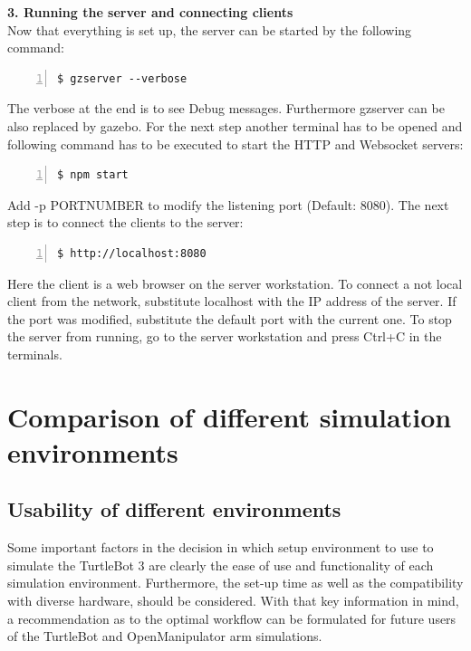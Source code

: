 \documentclass[plainarticle,zihtitle,english,final,hyperref,utf8]{zihpub}
\begin{document}
\textbf{3. Running the server and connecting clients}\\
\newline
Now that everything is set up, the server can be started by the following command:\\
\begin{Verbatim}[breaklines=true, breakanywhere=true, baselinestretch=1,fontsize=\scriptsize,numbers=left,frame=single,stepnumber=5,xleftmargin=1cm,xrightmargin=1cm]
$ gzserver --verbose

\end{Verbatim}
\newline
The verbose at the end is to see Debug messages. Furthermore gzserver can be also replaced by gazebo. For the next step another terminal has to be opened and following command has to be executed to start the HTTP and Websocket servers:\\
\begin{Verbatim}[breaklines=true, breakanywhere=true, baselinestretch=1,fontsize=\scriptsize,numbers=left,frame=single,stepnumber=5,xleftmargin=1cm,xrightmargin=1cm]
$ npm start

\end{Verbatim}
\newline
Add -p PORTNUMBER to modify the listening port (Default: 8080). The next step is to connect the clients to the server:\\
\begin{Verbatim}[breaklines=true, breakanywhere=true, baselinestretch=1,fontsize=\scriptsize,numbers=left,frame=single,stepnumber=5,xleftmargin=1cm,xrightmargin=1cm]
$ http://localhost:8080

\end{Verbatim}
Here the client is a web browser on the server workstation. To connect a not local client from the network, substitute localhost with the IP address of the server. If the port was modified, substitute the default port with the current one. To stop the server from running, go to the server workstation and press Ctrl+C in the terminals.
\newpage
\section{Comparison of different simulation environments}
\subsection{Usability of different environments}

Some important factors in the decision in which setup environment to use to simulate the TurtleBot 3 are clearly the ease of use and functionality of each simulation environment. Furthermore, the set-up time as well as the compatibility with diverse hardware, should be considered. With that key information in mind, a recommendation as to the optimal workflow can be formulated for future users of the TurtleBot and OpenManipulator arm simulations.
\end{document}
